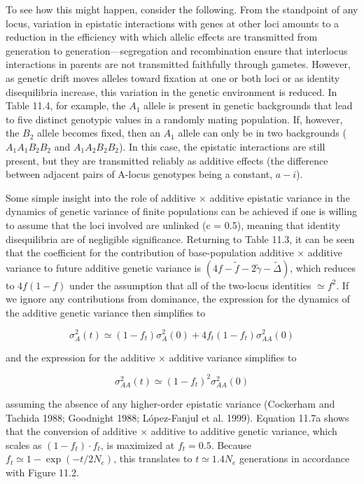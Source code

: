 \documentclass{article}
\begin{document}
To see how this might happen, consider the following. From the standpoint of any locus, variation in epistatic interactions with genes at other loci amounts to a reduction in the efficiency with which allelic effects are transmitted from generation to generation—segregation and recombination ensure that interlocus interactions in parents are not transmitted faithfully through gametes. However, as genetic drift moves alleles toward fixation at one or both loci or as identity disequilibria increase, this variation in the genetic environment is reduced. In Table 11.4, for example, the  $ A_{1} $ allele is present in genetic backgrounds that lead to five distinct genotypic values in a randomly mating population. If, however, the  $ B_{2} $ allele becomes fixed, then an  $ A_{1} $ allele can only be in two backgrounds ( $ A_{1}A_{1}B_{2}B_{2} $ and  $ A_{1}A_{2}B_{2}B_{2} $). In this case, the epistatic interactions are still present, but they are transmitted reliably as additive effects (the difference between adjacent pairs of A-locus genotypes being a constant,  $ a - i $).

Some simple insight into the role of additive × additive epistatic variance in the dynamics of genetic variance of finite populations can be achieved if one is willing to assume that the loci involved are unlinked (c = 0.5), meaning that identity disequilibria are of negligible significance. Returning to Table 11.3, it can be seen that the coefficient for the contribution of base-population additive × additive variance to future additive genetic variance is  $ (4f - \tilde{f} - 2\tilde{\gamma} - \tilde{\Delta}) $, which reduces to  $ 4f(1 - f) $ under the assumption that all of the two-locus identities  $ \simeq f^2 $. If we ignore any contributions from dominance, the expression for the dynamics of the additive genetic variance then simplifies to

\begin{equation}
\sigma_{A}^{2}(t)\simeq(1-f_{t})\sigma_{A}^{2}(0)+4f_{t}(1-f_{t})\sigma_{A A}^{2}(0)
\tag{11.7a}
\label{eq:11_7a}
\end{equation}

and the expression for the additive  $ \times $ additive variance simplifies to

\begin{equation}
\sigma_{A A}^{2}(t)\simeq(1-f_{t})^{2}\sigma_{A A}^{2}(0)
\tag{11.7b}
\label{eq:11_7b}
\end{equation}

assuming the absence of any higher-order epistatic variance (Cockerham and Tachida 1988; Goodnight 1988; López-Fanjul et al. 1999). Equation 11.7a shows that the conversion of additive × additive to additive genetic variance, which scales as  $ (1 - f_t) \cdot f_t $, is maximized at  $ f_t = 0.5 $. Because  $ f_t \simeq 1 - \exp(-t/2N_e) $, this translates to  $ t \simeq 1.4N_e $ generations in accordance with Figure 11.2.
\end{document}
